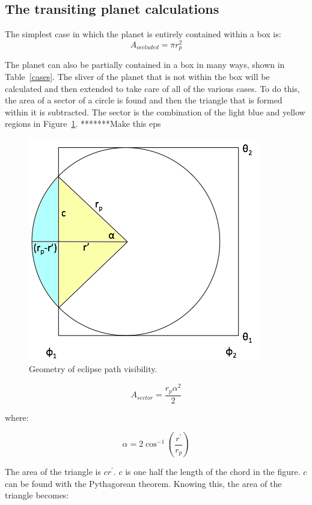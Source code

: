 \vspace{9mm}

\subsection{The transiting planet calculations \label{trans_appendix}}
The simplest case in which the planet is entirely contained within a box is:
\begin{equation}
	A_{occluded} = \pi r_p^2
\end{equation}

The planet can also be partially contained in a box in many ways, shown in Table~\ref{cases}. The sliver of the planet that is not within the box will be calculated and then extended to take care of all of the various cases. To do this, the area of a sector of a circle is found and then the triangle that is formed within it is subtracted. The sector is the combination of the light blue and yellow regions in Figure~\ref{eclipse}.
*******Make this eps
\begin{figure}[h]
	\centering
	\includegraphics[width=.5\textwidth]{images/figure.png}
	\caption{Geometry of eclipse path visibility.}
	\label{eclipse}
\end{figure}

\begin{equation}
	A_{sector} = \frac{r_p \alpha^2}{2}
\end{equation}

where:

\begin{equation}
	\alpha = 2 \cos^{-1}\left(\frac{r^{\prime}}{r_p}\right)
\end{equation}

The area of the triangle is $cr^{\prime}$. $c$ is one half the length of the chord in the figure. $c$ can be found with the Pythagorean theorem. Knowing this, the area of the triangle becomes: 

